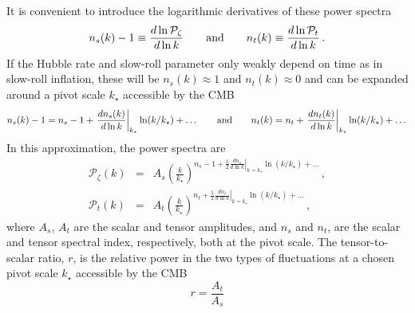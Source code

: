 It is convenient to introduce the logarithmic derivatives of these power spectra 
\begin{equation}\label{eq:specind}
n_s(k)-1\equiv\frac{d\ln \mathcal{P}_{\zeta}}{d\ln k}\qquad{\rm and}\qquad n_t(k)\equiv \frac{d\ln \mathcal{P}_t}{d\ln k}\,.
\end{equation}
If the Hubble rate and slow-roll parameter only weakly depend on time as in slow-roll inflation, these will be $n_s(k)\approx 1$ and $n_t(k)\approx 0$ and can be expanded around a pivot scale $k_\star$ accessible by the CMB
\begin{equation}
n_s(k)-1=n_s-1+\left.\frac{dn_s(k)}{d\ln k}\right|_{k_\star}\ln(k/k_\star)+\dots\qquad{\rm and}\qquad n_t(k)=n_t+\left.\frac{dn_t(k)}{d\ln k}\right|_{k_\star}\ln(k/k_\star)+\dots
\end{equation}
In this approximation, the power spectra are
\begin{eqnarray}
\mathcal{P}_{\zeta}(k)&=& A_s\left(\frac{k}{k_\star}\right)^{n_s-1+\frac{1}{2}\left.\frac{dn_s}{d\ln k}\right|_{k=k_\star}\ln(k/k_\star)+\dots}\,,\nonumber\\
\mathcal{P}_{t}(k)&=& A_t \left(\frac{k}{k_\star}\right)^{n_t+\frac{1}{2}\left.\frac{dn_t}{d\ln k}\right|_{k=k_\star}\ln(k/k_\star)+\dots}\,,
\end{eqnarray}
where $A_s$, $A_t$ are the scalar and tensor amplitudes, and $n_s$ and $n_t$, are the scalar and tensor spectral index, respectively, both at the pivot scale. 
The tensor-to-scalar ratio, $r$, is the relative power in the two types of fluctuations at a chosen pivot scale $k_\star$ accessible by the CMB
\begin{equation}
r=\frac{A_t}{A_s}
\end{equation}

